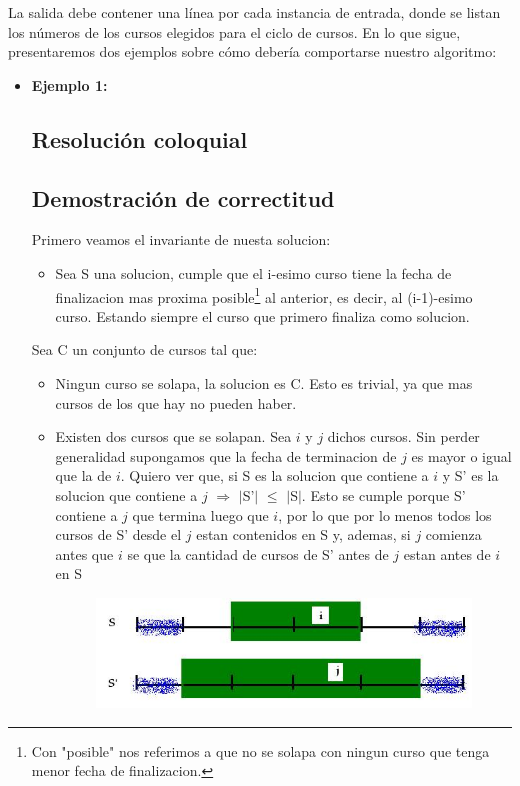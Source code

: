 La salida debe contener una línea por cada instancia de entrada, donde se listan los números de los cursos elegidos para el ciclo de cursos.\newline
\newline
En lo que sigue, presentaremos dos ejemplos sobre cómo debería comportarse nuestro algoritmo:
\begin{itemize}
\item {\large{\textbf{Ejemplo 1:}}}\newline
\subsection{Resolución coloquial}


\subsection{Demostración de correctitud}

Primero veamos el invariante de nuesta solucion:
\begin{itemize}
\item Sea S una solucion, cumple que el i-esimo curso tiene la fecha de finalizacion mas proxima posible\footnote{Con "posible" nos referimos a que no se solapa con ningun curso que tenga menor fecha de finalizacion.} al anterior, es decir, al (i-1)-esimo curso. Estando siempre el curso que primero finaliza como solucion.
\end{itemize}

Sea C un conjunto de cursos tal que:
\begin{itemize}
\item Ningun curso se solapa, la solucion es C. Esto es trivial, ya que mas cursos de los que hay no pueden  haber.
\item Existen dos cursos que se solapan. Sea $i$ y $j$ dichos cursos. Sin perder generalidad supongamos que la fecha de terminacion de $j$ es mayor o igual que la de $i$. Quiero ver que, si S es la solucion que contiene a $i$ y S' es la solucion que contiene a $j$ $\Rightarrow$ $|$S'$|$ $\leq$ $|$S$|$. 
  Esto se cumple porque S' contiene a $j$ que termina luego que $i$, por lo que por lo menos todos los cursos de S' desde el $j$ estan contenidos en S y, ademas, si  $j$ comienza antes que $i$ se que la cantidad de cursos de S' antes de $j$ estan antes de $i$ en S 

\begin{figure}[H] %
\begin{center}
\includegraphics[width=322pt]{../imgs/demo21.jpg}
\end{center}
\end{figure}


\end{itemize}
\end{itemize}
